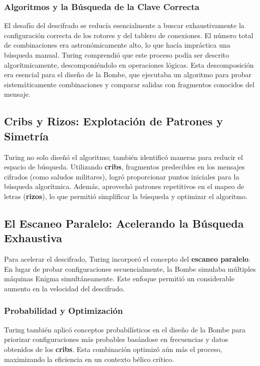 \documentclass{article}
\begin{document}
\subsubsection{Algoritmos y la Búsqueda de la Clave Correcta}

El desafío del descifrado se reducía esencialmente a buscar exhaustivamente la configuración correcta de los rotores y del tablero de conexiones. El número total de combinaciones era astronómicamente alto, lo que hacía impráctica una búsqueda manual. Turing comprendió que este proceso podía ser descrito algorítmicamente, descomponiéndolo en operaciones lógicas. Esta descomposición era esencial para el diseño de la Bombe, que ejecutaba un algoritmo para probar sistemáticamente combinaciones y comparar salidas con fragmentos conocidos del mensaje.

\subsection{\textbf{Cribs} y \textbf{Rizos}: Explotación de Patrones y Simetría}

Turing no solo diseñó el algoritmo; también identificó maneras para reducir el espacio de búsqueda.
Utilizando \textbf{cribs}, fragmentos predecibles en los mensajes cifrados (como saludos militares),
logró proporcionar puntos iniciales para la búsqueda algorítmica. 
Además, aprovechó patrones repetitivos en el mapeo de letras (\textbf{rizos}), 
lo que permitió simplificar la búsqueda y optimizar el algoritmo.\cite{AlanTuringEnigmaO}

\subsection{El Escaneo Paralelo: Acelerando la Búsqueda Exhaustiva}

Para acelerar el descifrado, Turing incorporó el concepto del \textbf{escaneo paralelo}.\cite{AlanTuringEnigmaO} 
En lugar de probar configuraciones secuencialmente, la Bombe simulaba múltiples máquinas Enigma simultáneamente. 
Este enfoque permitió un considerable aumento en la velocidad del descifrado.

\subsubsection{Probabilidad y Optimización}

Turing también aplicó conceptos probabilísticos en el diseño de la Bombe para priorizar configuraciones 
más probables basándose en frecuencias y datos obtenidos de los \textbf{cribs}. 
Esta combinación optimizó aún
más el proceso, maximizando la eficiencia en un contexto 
bélico crítico.\cite{AlanTuringEnigmaO}
\end{document}
